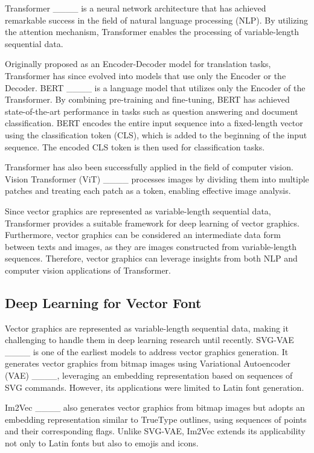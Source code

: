 Transformer ____ is a neural network architecture that has achieved remarkable success in the field of natural language processing (NLP).
By utilizing the attention mechanism, Transformer enables the processing of variable-length sequential data.

Originally proposed as an Encoder-Decoder model for translation tasks, Transformer has since evolved into models that use only the Encoder or the Decoder.
BERT ____ is a language model that utilizes only the Encoder of the Transformer.
By combining pre-training and fine-tuning, BERT has achieved state-of-the-art performance in tasks such as question answering and document classification.
BERT encodes the entire input sequence into a fixed-length vector using the classification token (CLS), which is added to the beginning of the input sequence.
The encoded CLS token is then used for classification tasks.

Transformer has also been successfully applied in the field of computer vision.
Vision Transformer (ViT) ____ processes images by dividing them into multiple patches and treating each patch as a token, enabling effective image analysis.

Since vector graphics are represented as variable-length sequential data, Transformer provides a suitable framework for deep learning of vector graphics.
Furthermore, vector graphics can be considered an intermediate data form between texts and images, as they are images constructed from variable-length sequences.
Therefore, vector graphics can leverage insights from both NLP and computer vision applications of Transformer.

\subsection{Deep Learning for Vector Font}

Vector graphics are represented as variable-length sequential data, making it challenging to handle them in deep learning research until recently.
SVG-VAE ____ is one of the earliest models to address vector graphics generation.
It generates vector graphics from bitmap images using Variational Autoencoder (VAE) ____, leveraging an embedding representation based on sequences of SVG commands.
However, its applications were limited to Latin font generation.

Im2Vec ____ also generates vector graphics from bitmap images but adopts an embedding representation similar to TrueType outlines, using sequences of points and their corresponding flags.
Unlike SVG-VAE, Im2Vec extends its applicability not only to Latin fonts but also to emojis and icons.

